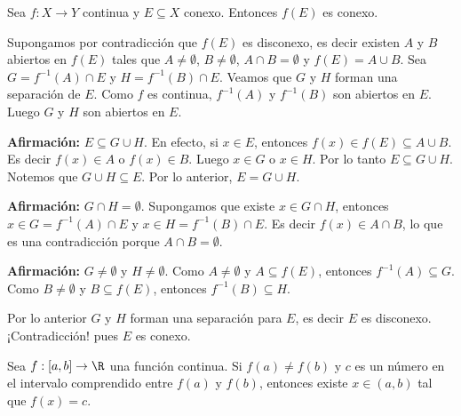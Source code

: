 \begin{teorema}
Sea $f: X \to Y$ continua y $E \subseteq X$ conexo. Entonces $f(E)$ es conexo. %
\end{teorema}

\begin{dem}
Supongamos por contradicción que $f(E)$ es disconexo, %
es decir existen $A$ y $B$ abiertos en $f(E)$ tales que $A \neq \emptyset$, $B \neq \emptyset$, $A \cap B = \emptyset$ y $f(E) = A \cup B$. %
Sea $G = f^{-1}(A) \cap E$ y $H = f^{-1}(B) \cap E$. %
Veamos que $G$ y $H$ forman una separación de $E$. %
Como $f$ es continua, $f^{-1}(A)$ y $f^{-1}(B)$ son abiertos en $E$. %
Luego $G$ y $H$ son abiertos en $E$. %

\textbf{Afirmación:} $E \subseteq G \cup H$. %
En efecto, si $x \in E$, entonces $f(x) \in f(E) \subseteq A \cup B$. %
Es decir $f(x) \in A$ o $f(x) \in B$. %
Luego $x \in G$ o $x \in H$. Por lo tanto $E \subseteq G \cup H$. %
Notemos que $G \cup H \subseteq E$. Por lo anterior, $E = G \cup H$. %

\textbf{Afirmación:} $G \cap H = \emptyset$. %
Supongamos que existe $x \in G \cap H$, entonces $x \in G = f^{-1}(A) \cap E$ y $x \in H = f^{-1}(B) \cap E$. %
Es decir $f(x) \in A \cap B$, lo que es una contradicción porque $A \cap B = \emptyset$. %

\textbf{Afirmación:} $G \neq \emptyset$ y $H \neq \emptyset$. %
Como $A \neq \emptyset$ y $A \subseteq f(E)$, entonces $f^{-1}(A) \subseteq G$. %
Como $B \neq \emptyset$ y $B \subseteq f(E)$, entonces $f^{-1}(B) \subseteq H$. %

Por lo anterior $G$ y $H$ forman una separación para $E$, es decir $E$ es disconexo. %
¡Contradicción! pues $E$ es conexo. %
\end{dem}

\begin{teorema} %
Sea $f: [a,b] \to \R$ una función continua. %
Si $f(a) \neq f(b)$ y $c$ es un número en el intervalo comprendido entre $f(a)$ y $f(b)$, %
entonces existe $x \in (a,b)$ tal que $f(x) = c$. %
\end{teorema}

